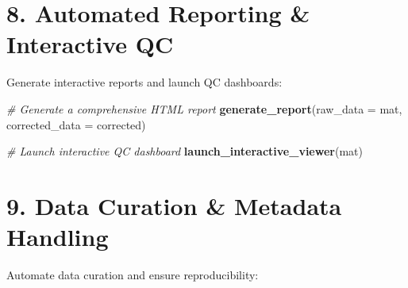 \documentclass[
]{article}
\newenvironment{Shaded}{\begin{snugshade}}{\end{snugshade}}
\newcommand{\AttributeTok}[1]{\textcolor[rgb]{0.13,0.29,0.53}{#1}}
\newcommand{\CommentTok}[1]{\textcolor[rgb]{0.56,0.35,0.01}{\textit{#1}}}
\newcommand{\FunctionTok}[1]{\textcolor[rgb]{0.13,0.29,0.53}{\textbf{#1}}}
\newcommand{\NormalTok}[1]{#1}
\begin{document}
\section{8. Automated Reporting \& Interactive
QC}\label{automated-reporting-interactive-qc}

Generate interactive reports and launch QC dashboards:

\begin{Shaded}
\begin{Highlighting}[]
\CommentTok{\# Generate a comprehensive HTML report}
\FunctionTok{generate\_report}\NormalTok{(}\AttributeTok{raw\_data =}\NormalTok{ mat, }\AttributeTok{corrected\_data =}\NormalTok{ corrected)}

\CommentTok{\# Launch interactive QC dashboard}
\FunctionTok{launch\_interactive\_viewer}\NormalTok{(mat)}
\end{Highlighting}
\end{Shaded}

\section{9. Data Curation \& Metadata
Handling}\label{data-curation-metadata-handling}

Automate data curation and ensure reproducibility:
\end{document}
